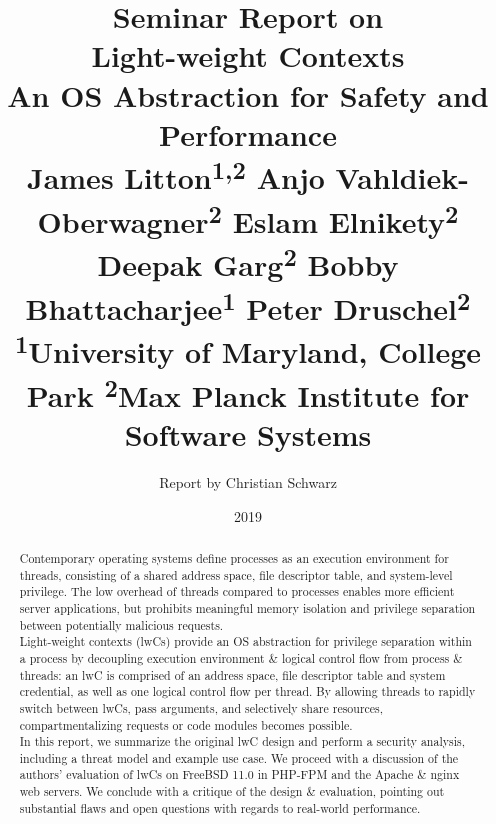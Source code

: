 \documentclass[10pt,twocolumn,a4paper]{article}
\begin{document}
\title{%
  {\normalfont \normalsize Seminar Report on}\\%
  Light-weight Contexts\\%
  {\normalfont \normalsize An OS Abstraction for Safety and Performance}\\%
  {\normalfont \small %
    James Litton\textsuperscript{1,2}
    Anjo Vahldiek-Oberwagner\textsuperscript{2}
    Eslam Elnikety\textsuperscript{2}
    Deepak Garg\textsuperscript{2}
    Bobby Bhattacharjee\textsuperscript{1}
    Peter Druschel\textsuperscript{2}
  }\\
  {\normalfont \small
    \textsuperscript{1}University of Maryland, College Park 
    \textsuperscript{2}Max Planck Institute for Software Systems
  }%
}
\author{Report by Christian Schwarz}
\date{2019}

\maketitle

\begin{abstract}
Contemporary operating systems define processes as an execution environment for threads, consisting of a shared address space, file descriptor table, and system-level privilege.
The low overhead of threads compared to processes enables more efficient server applications, but prohibits meaningful memory isolation and privilege separation between potentially malicious requests.\\
Light-weight contexts (lwCs) provide an OS abstraction for privilege separation within a process by decoupling execution environment \& logical control flow from process \& threads:
an lwC is comprised of an address space, file descriptor table and system credential, as well as one logical control flow per thread.
By allowing threads to rapidly switch between lwCs, pass arguments, and selectively share resources, compartmentalizing requests or code modules becomes possible.\\
In this report, we summarize the original lwC design and perform a security analysis, including a threat model and example use case.
We proceed with a discussion of the authors' evaluation of lwCs on FreeBSD 11.0 in PHP-FPM and the Apache \& nginx web servers.
We conclude with a critique of the design \& evaluation, pointing out substantial flaws and open questions with regards to real-world performance.
\end{abstract}
\end{document}
